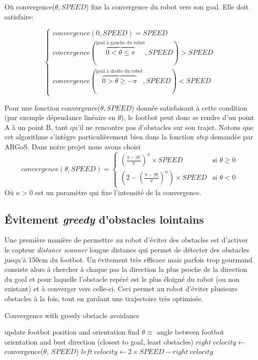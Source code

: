 Où convergence($\theta, SPEED$) fixe la convergence du robot vers son goal. Elle doit satisfaire:

\begin{equation}
  \begin{cases}
    convergence(0,SPEED)=SPEED\\
    convergence(\overset{\text{goal à gauche du robot}}{\overbrace{0<\theta\leq\pi}},SPEED)>SPEED\\
    convergence(\overset{\text{goal à droite du robot}}{\overbrace{0>\theta\geq-\pi}},SPEED)<SPEED
  \end{cases}
\end{equation}

Pour une fonction convergence($\theta, SPEED$) donnée satisfaisant à cette condition (par exemple dépendance linéaire en \(\theta\)), le footbot peut donc se rendre d'un point A à un point B, tant qu'il ne rencontre pas d'obstacles sur son trajet. Notons que cet algorithme s'intègre particulièrement bien dans la fonction \emph{step} demandée par ARGoS. Dans notre projet nous avons choisi
\[
convergence(\theta, SPEED)=
\begin{cases}
      { \left( \frac{\pi- \lvert \theta \rvert }{\pi} \right)}^{\kappa} \times SPEED & \text{si } \theta \geq 0\\
      \left( 2 - { \left( \frac{\pi- \lvert \theta \rvert }{\pi} \right) }^{\kappa} \right) \times SPEED & \text{si } \theta < 0
\end{cases}
\]
Où $\kappa > 0$ est un paramètre qui fixe l'intensité de la convergence.

\subsection{Évitement \emph{greedy} d'obstacles lointains}

Une première manière de permettre au robot d'éviter des obstacles est d'activer le capteur \emph{distance scanner} longue distance qui permet de détecter des obstacles jusqu'à 150cm du footbot. Un évitement très efficace mais parfois trop gourmand consiste alors à chercher à chaque pas la direction la plus proche de la direction du goal et pour laquelle l'obstacle repéré est le plus éloigné du robot (ou non existant) et à converger vers celle-ci. Ceci permet au robot d'éviter plusieurs obstacles à la fois, tout en gardant une trajectoire très optimisée.

\begin{algorithm}                    
\caption{Convergence with greedy obstacle avoidance}
\label{greedyConvergence}
\begin{algorithmic}
    \STATE update footbot position and orientation
    \STATE find \( \theta \equiv\) angle between footbot orientation and best direction (closest to goal, least obstacles)
    \STATE \( right\:velocity \gets\) convergence(\(\theta,\:SPEED\))
    \STATE \( left\:velocity \gets 2 \times SPEED-right\:velocity\) 
  \ENDWHILE
\end{algorithmic}
\end{algorithm}

